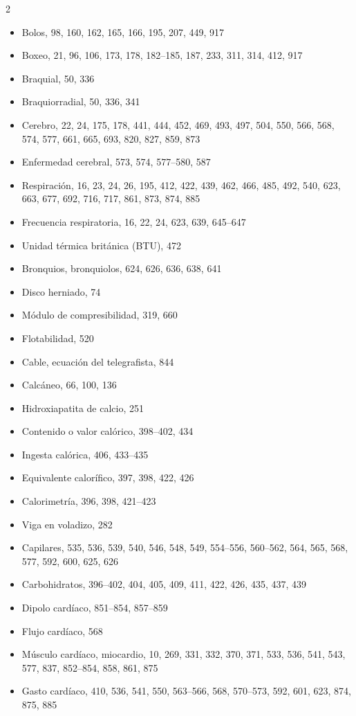\documentclass[12pt,a4paper]{book}
\begin{document}
\begin{multicols}{2}
\begin{itemize}[leftmargin=*]
  \item Bolos, 98, 160, 162, 165, 166, 195, 207, 449, 917
  \item Boxeo, 21, 96, 106, 173, 178, 182--185, 187, 233, 311, 314, 412, 917
  \item Braquial, 50, 336
  \item Braquiorradial, 50, 336, 341
  \item Cerebro, 22, 24, 175, 178, 441, 444, 452, 469, 493, 497, 504, 550, 566, 568, 574, 577, 661, 665, 693, 820, 827, 859, 873
  \item Enfermedad cerebral, 573, 574, 577--580, 587
  \item Respiración, 16, 23, 24, 26, 195, 412, 422, 439, 462, 466, 485, 492, 540, 623, 663, 677, 692, 716, 717, 861, 873, 874, 885
  \item Frecuencia respiratoria, 16, 22, 24, 623, 639, 645--647
  \item Unidad térmica británica (BTU), 472
  \item Bronquios, bronquiolos, 624, 626, 636, 638, 641
  \item Disco herniado, 74
  \item Módulo de compresibilidad, 319, 660
  \item Flotabilidad, 520
  \item Cable, ecuación del telegrafista, 844
  \item Calcáneo, 66, 100, 136
  \item Hidroxiapatita de calcio, 251
  \item Contenido o valor calórico, 398--402, 434
  \item Ingesta calórica, 406, 433--435
  \item Equivalente calorífico, 397, 398, 422, 426
  \item Calorimetría, 396, 398, 421--423
  \item Viga en voladizo, 282
  \item Capilares, 535, 536, 539, 540, 546, 548, 549, 554--556, 560--562, 564, 565, 568, 577, 592, 600, 625, 626
  \item Carbohidratos, 396--402, 404, 405, 409, 411, 422, 426, 435, 437, 439
  \item Dipolo cardíaco, 851--854, 857--859
  \item Flujo cardíaco, 568
  \item Músculo cardíaco, miocardio, 10, 269, 331, 332, 370, 371, 533, 536, 541, 543, 577, 837, 852--854, 858, 861, 875
  \item Gasto cardíaco, 410, 536, 541, 550, 563--566, 568, 570--573, 592, 601, 623, 874, 875, 885

\end{itemize}
\end{multicols}
\end{document}
